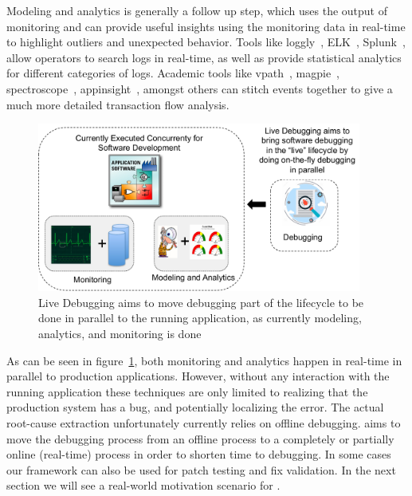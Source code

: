 Modeling and analytics is generally a follow up step, which uses the output of monitoring and can provide useful insights using the monitoring data in real-time to highlight outliers and unexpected behavior.
Tools like loggly~\cite{loggly}, ELK~\cite{elk}, Splunk~\cite{splunk}, allow operators to search logs in real-time, as well as provide statistical analytics for different categories of logs.
Academic tools like vpath~\cite{vpath}, magpie~\cite{magpie}, spectroscope~\cite{spectroscope}, appinsight~\cite{appinsight}, amongst others can stitch events together to give a much more detailed transaction flow analysis.

\begin{figure}[h!]
	\begin{center}
		\includegraphics[width=0.95\textwidth]{intro/livedebuggingTrends.pdf}
		\caption{Live Debugging aims to move debugging part of the lifecycle to be done in parallel to the running application, as currently modeling, analytics, and monitoring is done}
		\label{fig:liveDebugTrends}
	\end{center}
\end{figure}


As can be seen in figure~\ref{fig:liveDebugTrends}, 
both monitoring and analytics happen in real-time in parallel to production applications. However, without any interaction with the running application these techniques are only limited to realizing that the production system has a bug, and potentially localizing the error.
The actual root-cause extraction unfortunately currently relies on offline debugging.
\parikshan aims to move the debugging process from an offline process to a completely or partially online (real-time) process in order to shorten time to debugging.
In some cases our framework can also be used for patch testing and fix validation.
In the next section we will see a real-world motivation scenario for \parikshan.



